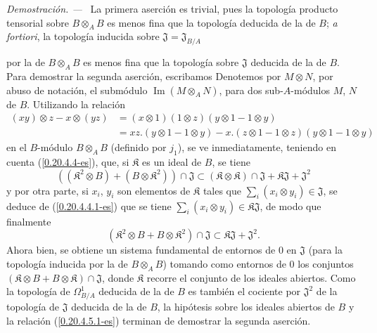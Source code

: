 \documentclass[10pt,oneside]{book}
\newcommand{\sref}[1]{\textup{(\ref{#1})}}
\newcommand{\oldpage}[2][]{%
  \setcounter{footnote}{0}%
  \marginpar{\scriptsize\textbf{#1}~|~#2}\ignorespaces}
\newenvironment{proof}{%
  \par\medskip\noindent\textit{Demostración. ---\ }}{\par}
\providecommand{\setmin}{-}%
\begin{document}
\begin{proof}
La primera aserción es trivial, pues la topología producto tensorial sobre
$B\otimes_A B$ es menos fina que la topología deducida de la de $B$;
\emph{a fortiori}, la topología inducida sobre
$\mathfrak{J}=\mathfrak{J}_{B/A}$

\oldpage[0\textsubscript{IV-1}]{125}
por la de $B\otimes_A B$ es menos fina que la topología sobre $\mathfrak{J}$
deducida de la de $B$. Para demostrar la segunda aserción, escribamos
Denotemos por $M\otimes N$, por abuso de notación, el submódulo
$\operatorname{Im}(M\otimes_A N)$, para dos sub-$A$-módulos $M$, $N$ de $B$.
Utilizando la relación
\[
\begin{aligned}
  (xy)\otimes z\setmin x\otimes(yz)
  &=(x\otimes1)(1\otimes z)(y\otimes1\setmin 1\otimes y)\\
  &=xz.(y\otimes1\setmin 1\otimes y)
    \setmin x.(z\otimes1\setmin 1\otimes z)(y\otimes1\setmin 1\otimes y)
\end{aligned}
\]
en el $B$-módulo $B\otimes_A B$ (definido por $j_1$), se ve inmediatamente,
teniendo en cuenta \sref{0.20.4.4-es}, que, si $\mathfrak K$ es un ideal de
$B$, se tiene
\[
  ((\mathfrak K^2\otimes B)+(B\otimes\mathfrak K^2))\cap\mathfrak{J}
  \subset(\mathfrak K\otimes\mathfrak K)\cap\mathfrak{J}
  +\mathfrak K\mathfrak{J}+\mathfrak{J}^2
\]
y por otra parte, si $x_i$, $y_i$ son elementos de $\mathfrak K$ tales
que $\sum_i(x_i\otimes y_i)\in\mathfrak{J}$, se deduce de
\sref{0.20.4.4.1-es} que se tiene
$\sum_i(x_i\otimes y_i)\in\mathfrak K\mathfrak{J}$, de modo que finalmente
\begin{equation}
\tag{20.4.5.1}
\label{0.20.4.5.1-es}
  (\mathfrak K^2\otimes B+B\otimes\mathfrak K^2)\cap\mathfrak{J}
  \subset\mathfrak K\mathfrak{J}+\mathfrak{J}^2.
\end{equation}
Ahora bien, se obtiene un sistema fundamental de entornos de $0$ en $\mathfrak{J}$
(para la topología inducida por la de $B\otimes_A B$) tomando como
entornos de $0$ los conjuntos
$(\mathfrak K\otimes B+B\otimes\mathfrak K)\cap\mathfrak{J}$, donde
$\mathfrak K$ recorre el conjunto de los ideales abiertos. Como la topología de
$\Omega^1_{B/A}$ deducida de la de $B$ es también el cociente por
$\mathfrak{J}^2$ de la topología de $\mathfrak{J}$ deducida de la de $B$,
la hipótesis sobre los ideales abiertos de $B$ y la relación
\sref{0.20.4.5.1-es} terminan de demostrar la segunda aserción.
\end{proof}
\end{document}
